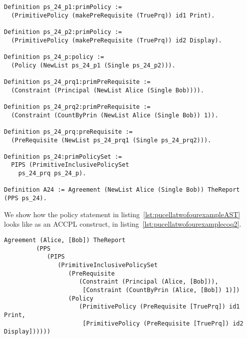 \begin{minipage}[c]{0.95\textwidth}
\begin{lstlisting}
Definition ps_24_p1:primPolicy := 
  (PrimitivePolicy (makePreRequisite (TruePrq)) id1 Print).

Definition ps_24_p2:primPolicy := 
  (PrimitivePolicy (makePreRequisite (TruePrq)) id2 Display).

Definition ps_24_p:policy := 
  (Policy (NewList ps_24_p1 (Single ps_24_p2))).

Definition ps_24_prq1:primPreRequisite := 
  (Constraint (Principal (NewList Alice (Single Bob)))).

Definition ps_24_prq2:primPreRequisite := 
  (Constraint (CountByPrin (NewList Alice (Single Bob)) 1)).
 
Definition ps_24_prq:preRequisite := 
  (PreRequisite (NewList ps_24_prq1 (Single ps_24_prq2))).

Definition ps_24:primPolicySet :=
  PIPS (PrimitiveInclusivePolicySet
    ps_24_prq ps_24_p).

Definition A24 := Agreement (NewList Alice (Single Bob)) TheReport (PPS ps_24).
\end{lstlisting}
\end{minipage} 

We show how the policy statement in listing~\ref{lst:pucellatwofourexampleAST} looks like as an \ac{ACCPL} construct, in listing~\ref{lst:pucellatwofourexamplecoq2}.

\begin{minipage}[c]{0.95\textwidth}
\begin{lstlisting}
Agreement (Alice, [Bob]) TheReport
         (PPS
            (PIPS
               (PrimitiveInclusivePolicySet
                  (PreRequisite
                     (Constraint (Principal (Alice, [Bob])),
                      [Constraint (CountByPrin (Alice, [Bob]) 1)])
                  (Policy
                     (PrimitivePolicy (PreRequisite [TruePrq]) id1 Print,
                      [PrimitivePolicy (PreRequisite [TruePrq]) id2 Display])))))

\end{lstlisting}
\end{minipage} 

%

